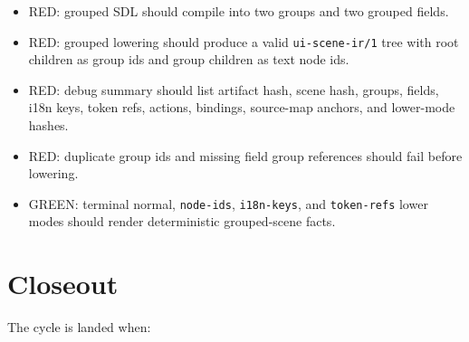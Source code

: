 \begin{itemize}
\tightlist
\item
  RED: grouped SDL should compile into two groups and two grouped fields.
\item
  RED: grouped lowering should produce a valid \texttt{u\allowbreak{}i\allowbreak{}-\allowbreak{}s\allowbreak{}c\allowbreak{}e\allowbreak{}n\allowbreak{}e\allowbreak{}-\allowbreak{}i\allowbreak{}r\allowbreak{}/\allowbreak{}1} tree with root children as group ids and group children as text node ids.
\item
  RED: debug summary should list artifact hash, scene hash, groups, fields, i18n keys, token refs, actions, bindings, source-map anchors, and lower-mode hashes.
\item
  RED: duplicate group ids and missing field group references should fail before lowering.
\item
  GREEN: terminal normal, \texttt{n\allowbreak{}o\allowbreak{}d\allowbreak{}e\allowbreak{}-\allowbreak{}i\allowbreak{}d\allowbreak{}s}, \texttt{i\allowbreak{}1\allowbreak{}8\allowbreak{}n\allowbreak{}-\allowbreak{}k\allowbreak{}e\allowbreak{}y\allowbreak{}s}, and \texttt{t\allowbreak{}o\allowbreak{}k\allowbreak{}e\allowbreak{}n\allowbreak{}-\allowbreak{}r\allowbreak{}e\allowbreak{}f\allowbreak{}s} lower modes should render deterministic grouped-scene facts.
\end{itemize}

\section{Closeout}\label{record-141-closeout}

The cycle is landed when:

